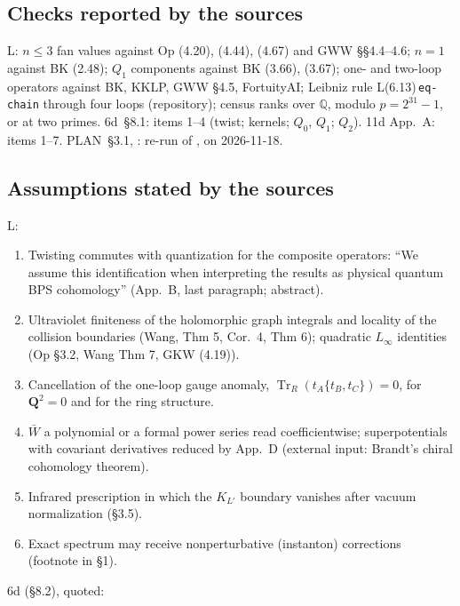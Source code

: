 \documentclass[10pt,a4paper]{article}
\numberwithin{equation}{section}
\newcommand{\LL}[2]{\textsf{L}(#1){\scriptsize\,\texttt{#2}}}
\begin{document}
\subsection{Checks reported by the sources}
\textsf{L}: $n\le3$ fan values against \textsf{Op} (4.20), (4.44), (4.67) and GWW \S\S4.4--4.6; $n=1$ against BK (2.48); $Q_1$ components against BK (3.66), (3.67); one- and two-loop operators against BK, KKLP, GWW \S4.5, FortuityAI; Leibniz rule \LL{6.13}{eq-chain} through four loops (repository); census ranks over $\mathbb Q$, modulo $p=2^{31}-1$, or at two primes.
\textsf{6d}~\S8.1: items 1--4 (twist; kernels; $Q_0$, $Q_1$; $Q_2$).
\textsf{11d} App.~A: items 1--7.
\textsf{PLAN}~\S3.1, : re-run of ,  on 2026-11-18.

\subsection{Assumptions stated by the sources}
\textsf{L}:
\begin{enumerate}\itemsep1pt
\item Twisting commutes with quantization for the composite operators: ``We assume this identification when interpreting the results as physical quantum BPS cohomology'' (App.~B, last paragraph; abstract).
\item Ultraviolet finiteness of the holomorphic graph integrals and locality of the collision boundaries (Wang, Thm 5, Cor.~4, Thm 6); quadratic $L_\infty$ identities (\textsf{Op} \S3.2, Wang Thm 7, \textsf{GKW} (4.19)).
\item Cancellation of the one-loop gauge anomaly, $\operatorname{Tr}_R(t_A\{t_B,t_C\})=0$, for $\mathbf Q^2=0$ and for the ring structure.
\item $\bar W$ a polynomial or a formal power series read coefficientwise; superpotentials with covariant derivatives reduced by App.~D (external input: Brandt's chiral cohomology theorem).
\item Infrared prescription in which the $K_{L'}$ boundary vanishes after vacuum normalization (\S3.5).
\item Exact spectrum may receive nonperturbative (instanton) corrections (footnote in \S1).
\end{enumerate}
\textsf{6d} (\S8.2), quoted:
\end{document}
